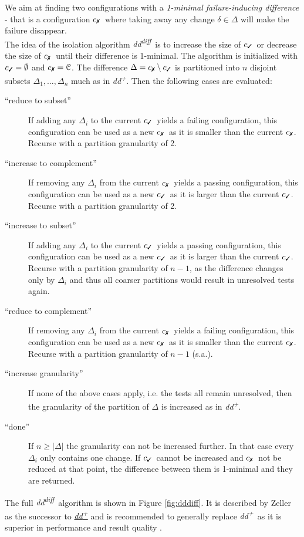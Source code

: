 \documentclass[a4paper,UKenglish]{lipics-v2018}
\newcommand{\ddp}{\textit{dd\textsuperscript{+}}}
\newcommand{\dddiff}{\textit{dd\textsuperscript{diff}}}
\newcommand{\C}[0]{\ensuremath{\mathcal{C}}}
\newcommand{\cmark}{\text{\ding{51}}}
\newcommand{\xmark}{\text{\ding{55}}}
\newcommand{\cpass}{\ensuremath{c_{\cmark}}}
\newcommand{\cfail}{\ensuremath{c_{\xmark}}}
\begin{document}
We aim at finding two configurations with a \textit{1-minimal failure-inducing difference} - that is a configuration \cfail\ where taking away any change $\delta \in \Delta$ will make the failure disappear.\\

The idea of the isolation algorithm \dddiff\ is to increase the size of \cpass\ or decrease the size of \cfail\ until their difference is 1-minimal. The algorithm is initialized with $\cpass = \emptyset$ and $\cfail = \C$. The difference $\Delta = \cfail \setminus \cpass$ is partitioned into $n$ disjoint subsets $\Delta_1, ..., \Delta_n$ much as in \ddp. Then the following cases are evaluated:

\begin{description}
  	\item[``reduce to subset''] If adding any $\Delta_i$ to the current \cpass\ yields a failing configuration, this configuration can be used as a new \cfail\ as it is smaller than the current \cfail. Recurse with a partition granularity of 2.
  	\item[``increase to complement''] If removing any $\Delta_i$ from the current \cfail\ yields a passing configuration, this configuration can be used as a new \cpass\ as it is larger than the current \cpass. Recurse with a partition granularity of 2.
  	\item[``increase to subset''] If adding any $\Delta_i$ to the current \cpass\ yields a passing configuration, this configuration can be used as a new \cpass\ as it is larger than the current \cpass. Recurse with a partition granularity of $n-1$, as the difference changes only by $\Delta_i$ and thus all coarser partitions would result in unresolved tests again.
  	\item[``reduce to complement''] If removing any $\Delta_i$ from the current \cfail\ yields a failing configuration, this configuration can be used as a new \cfail\, as it is smaller than the current \cfail. Recurse with a partition granularity of $n-1$ (s.a.).
  	\item[``increase granularity''] If none of the above cases apply, i.e. the tests all remain unresolved, then the granularity of the partition of $\Delta$ is increased as in \ddp. 
  	\item[``done''] If $n \ge |\Delta|$ the granularity can not be increased further. In that case every $\Delta_i$ only contains one change. If \cpass\ cannot be increased and \cfail\ not be reduced at that point, the difference between them is 1-minimal and they are returned.\\
\end{description}
The full \dddiff\ algorithm is shown in Figure \ref{fig:dddiff}. It is described by Zeller as the successor to \hyperref[fig:ddp]{\ddp} and is recommended to generally replace \ddp\ as it is superior in performance and result quality \cite{Zeller:2002:SIF:506201.506206}. \\
\end{document}
